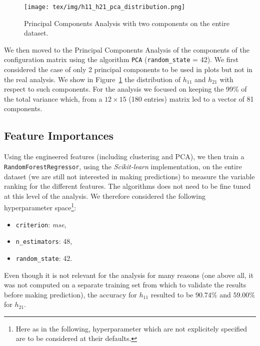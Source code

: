     \begin{figure}[!t]
        \centering
        \texttt{[image: tex/img/h11\_h21\_pca\_distribution.png]}
        \caption{Principal Components Analysis with two components on the entire dataset.}
        \label{fig:pca_analysis}
    \end{figure}
    
    We then moved to the Principal Components Analysis of the components of the configuration matrix using the algorithm \texttt{PCA} (\texttt{random\_state} = 42). We first considered the case of only 2 principal components to be used in plots but not in the real analysis. We show in Figure~\ref{fig:pca_analysis} the distribution of $h_{11}$ and $h_{21}$ with respect to such components. For the analysis we focused on keeping the 99\% of the total variance which, from a $12 \times 15$ (180 entries) matrix led to a vector of 81 components.
    
\subsection{Feature Importances}

    Using the engineered features (including clustering and PCA), we then train a \texttt{RandomForestRegressor}, using the \textit{Scikit-learn} implementation, on the entire dataset (we are still not interested in making predictions) to measure the variable ranking for the different features. The algorithms does not need to be fine tuned at this level of the analysis. We therefore considered the following hyperparameter space\footnote{Here as in the following, hyperparameter which are not explicitely specified are to be considered at their defaults.}:
    \begin{itemize}
        \item \texttt{criterion}: \textit{mse},
        \item \texttt{n\_estimators}: 48,
        \item \texttt{random\_state}: 42.
    \end{itemize}
    Even though it is not relevant for the analysis for many reasons (one above all, it was not computed on a separate training set from which to validate the results before making prediction), the accuracy for $h_{11}$ resulted to be $90.74\%$ and $59.00\%$ for $h_{21}$.
    
